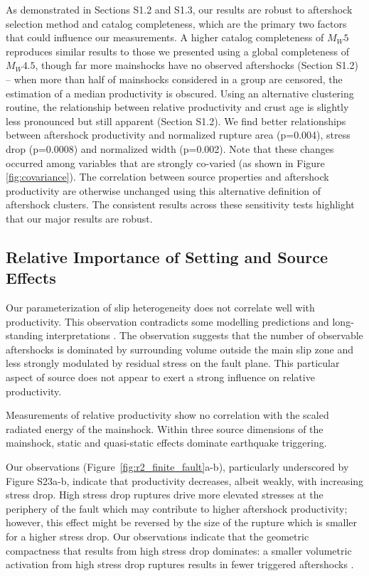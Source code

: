 \documentclass[draft, jgrga]{agujournal2018}
\begin{document}
As demonstrated in Sections S1.2 and S1.3, our results are robust to aftershock selection method and catalog completeness, which are the primary two factors that could influence our measurements. A higher catalog completeness of $M_W5$ reproduces similar results to those we presented using a global completeness of $M_W4.5$, though far more mainshocks have no observed aftershocks (Section S1.2) -- when more than half of mainshocks considered in a group are censored, the estimation of a median productivity is obscured. Using an alternative clustering routine, the relationship between relative productivity and crust age is slightly less pronounced but still apparent (Section S1.2). We find better relationships between aftershock productivity and normalized rupture area (p=0.004), stress drop (p=0.0008) and normalized width (p=0.002). Note that these changes occurred among variables that are strongly co-varied (as shown in Figure \ref{fig:covariance}). The correlation between source properties and aftershock productivity are otherwise unchanged using this alternative definition of aftershock clusters. The consistent results across these sensitivity tests highlight that our major results are robust.

\subsection{Relative Importance of Setting and Source Effects}

Our parameterization of slip heterogeneity does not correlate well with productivity. This observation contradicts some modelling predictions \citep{Helmstetter2006RelationModel, Marsan2006} and long-standing interpretations \citep[e.g.][]{Mogi1967}. The observation suggests that the number of observable aftershocks is dominated by surrounding volume outside the main slip zone and less strongly modulated by residual stress on the fault plane. This particular aspect of source does not appear to exert a strong influence on relative productivity.

Measurements of relative productivity show no correlation with the scaled radiated energy of the mainshock. Within three source dimensions of the mainshock, static and quasi-static effects dominate earthquake triggering.

Our observations (Figure~\ref{fig:r2_finite_fault}a-b), particularly underscored by Figure S23a-b, indicate that productivity decreases, albeit weakly, with increasing stress drop. High stress drop ruptures drive more elevated stresses at the periphery of the fault which may contribute to higher aftershock productivity; however, this effect might be reversed by the size of the rupture which is smaller for a higher stress drop. Our observations indicate that the geometric compactness that results from high stress drop dominates: a smaller volumetric activation from high stress drop ruptures results in fewer triggered aftershocks \citep{Wetzler2016}.
\end{document}
